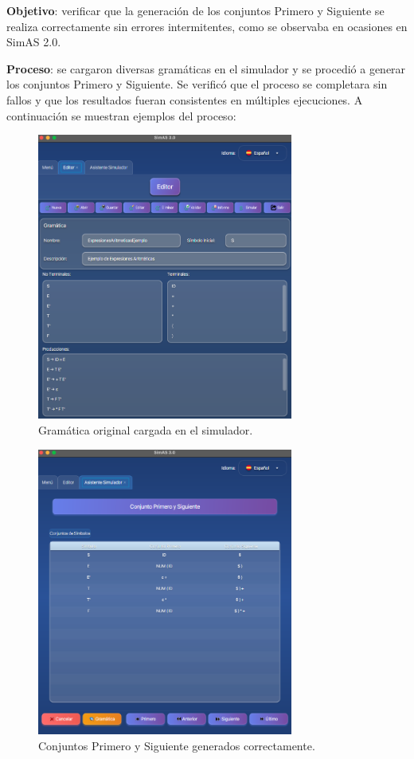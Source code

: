 \textbf{Objetivo}: verificar que la generación de los conjuntos Primero y Siguiente se realiza correctamente sin errores intermitentes, como se observaba en ocasiones en SimAS 2.0.
\medskip

\textbf{Proceso}: se cargaron diversas gramáticas en el simulador y se procedió a generar los conjuntos Primero y Siguiente. Se verificó que el proceso se completara sin fallos y que los resultados fueran consistentes en múltiples ejecuciones. A continuación se muestran ejemplos del proceso:
\medskip

\needspace{6cm}
\begin{figure}[H]
  \centering
  \includegraphics[width=0.75\textwidth]{figuras2/pruebas/simulador/gramatica.png}
  \caption{Gramática original cargada en el simulador.}
\end{figure}

\needspace{6cm}
\begin{figure}[H]
  \centering
  \includegraphics[width=0.75\textwidth]{figuras2/pruebas/simulador/conjuntos.png}
  \caption{Conjuntos Primero y Siguiente generados correctamente.}
\end{figure}

